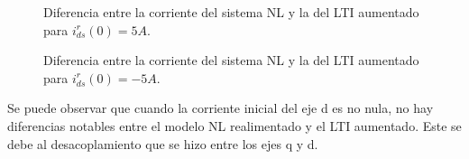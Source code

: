 \documentclass[a4paper, 10pt, onecolumn,journal]{ieeeconf}
\begin{document}
\begin{figure}[H]
	\centering
	\begin{adjustbox}{max width=\columnwidth}
	\end{adjustbox}
	\caption{Diferencia entre la corriente del sistema NL y la del LTI aumentado para $i^r_{ds}(0) = 5A $.}
	\label{Diferencia entre la corriente del sistema NL y la del LTI aumentado para $i^r_{ds}(0) = 5A $}
\end{figure}

\begin{figure}[H]
	\centering
	\begin{adjustbox}{max width=\columnwidth}
	\end{adjustbox}
	\caption{Diferencia entre la corriente del sistema NL y la del LTI aumentado para $i^r_{ds}(0) = -5A $.}
	\label{Diferencia entre la corriente del sistema NL y la del LTI aumentado para $i^r_{ds}(0) = -5A $}
\end{figure}
Se puede observar que cuando la corriente inicial del eje d es no nula, no hay diferencias notables entre el modelo NL realimentado y el LTI aumentado. Este se debe al desacoplamiento que se hizo entre los ejes q y d.
\end{document}

